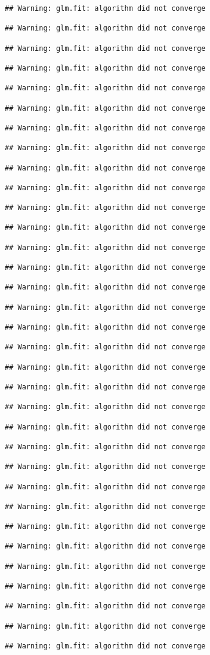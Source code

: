 \documentclass[
]{article}
\begin{document}
\begin{verbatim}
## Warning: glm.fit: algorithm did not converge

## Warning: glm.fit: algorithm did not converge

## Warning: glm.fit: algorithm did not converge

## Warning: glm.fit: algorithm did not converge

## Warning: glm.fit: algorithm did not converge

## Warning: glm.fit: algorithm did not converge

## Warning: glm.fit: algorithm did not converge

## Warning: glm.fit: algorithm did not converge

## Warning: glm.fit: algorithm did not converge

## Warning: glm.fit: algorithm did not converge

## Warning: glm.fit: algorithm did not converge

## Warning: glm.fit: algorithm did not converge

## Warning: glm.fit: algorithm did not converge

## Warning: glm.fit: algorithm did not converge

## Warning: glm.fit: algorithm did not converge

## Warning: glm.fit: algorithm did not converge

## Warning: glm.fit: algorithm did not converge

## Warning: glm.fit: algorithm did not converge

## Warning: glm.fit: algorithm did not converge

## Warning: glm.fit: algorithm did not converge

## Warning: glm.fit: algorithm did not converge

## Warning: glm.fit: algorithm did not converge

## Warning: glm.fit: algorithm did not converge

## Warning: glm.fit: algorithm did not converge

## Warning: glm.fit: algorithm did not converge

## Warning: glm.fit: algorithm did not converge

## Warning: glm.fit: algorithm did not converge

## Warning: glm.fit: algorithm did not converge

## Warning: glm.fit: algorithm did not converge

## Warning: glm.fit: algorithm did not converge

## Warning: glm.fit: algorithm did not converge

## Warning: glm.fit: algorithm did not converge

## Warning: glm.fit: algorithm did not converge
\end{verbatim}
\end{document}
